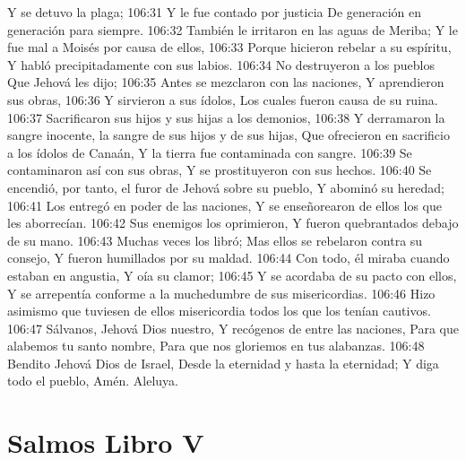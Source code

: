 Y se detuvo la plaga; 
106:31 Y le fue contado por justicia 
De generación en generación para siempre. 
106:32 También le irritaron en las aguas de Meriba; 
Y le fue mal a Moisés por causa de ellos, 
106:33 Porque hicieron rebelar a su espíritu, 
Y habló precipitadamente con sus labios. 
106:34 No destruyeron a los pueblos 
Que Jehová les dijo; 
106:35 Antes se mezclaron con las naciones, 
Y aprendieron sus obras, 
106:36 Y sirvieron a sus ídolos, 
Los cuales fueron causa de su ruina. 
106:37 Sacrificaron sus hijos y sus hijas a los demonios, 
106:38 Y derramaron la sangre inocente, la sangre de sus hijos y de sus hijas, 
Que ofrecieron en sacrificio a los ídolos de Canaán, 
Y la tierra fue contaminada con sangre. 
106:39 Se contaminaron así con sus obras, 
Y se prostituyeron con sus hechos. 
106:40 Se encendió, por tanto, el furor de Jehová sobre su pueblo, 
Y abominó su heredad; 
106:41 Los entregó en poder de las naciones, 
Y se enseñorearon de ellos los que les aborrecían. 
106:42 Sus enemigos los oprimieron, 
Y fueron quebrantados debajo de su mano. 
106:43 Muchas veces los libró; 
Mas ellos se rebelaron contra su consejo, 
Y fueron humillados por su maldad. 
106:44 Con todo, él miraba cuando estaban en angustia, 
Y oía su clamor; 
106:45 Y se acordaba de su pacto con ellos, 
Y se arrepentía conforme a la muchedumbre de sus misericordias. 
106:46 Hizo asimismo que tuviesen de ellos misericordia todos los que los tenían cautivos. 
106:47 Sálvanos, Jehová Dios nuestro, 
Y recógenos de entre las naciones, 
Para que alabemos tu santo nombre, 
Para que nos gloriemos en tus alabanzas. 
106:48 Bendito Jehová Dios de Israel, 
Desde la eternidad y hasta la eternidad; 
Y diga todo el pueblo, Amén. 
Aleluya.


\chapter{Salmos Libro V}



